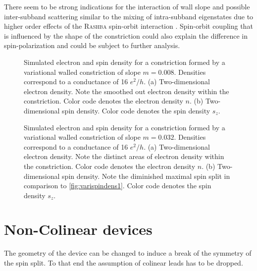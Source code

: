 There seem to be strong indications for the interaction of wall slope and possible inter-subband scattering similar to the mixing of intra-subband eigenstates due to higher order effects of the \textsc{Rashba} spin-orbit interaction \cite{Wolfgang2003PhysicaE.18.337}. Spin-orbit coupling that is influenced by the shape of the constriction could also explain the difference in spin-polarization and could be subject to further analysis.
\begin{figure}[h]
\caption{Simulated electron and spin density for a constriction formed by a variational walled constriction of slope $m=0.008$. Densities correspond to a conductance of 16 $e^2/h$. (a) Two-dimensional electron density. Note the smoothed out electron density within the constriction. Color code denotes the electron density $n$. (b) Two-dimensional spin density. Color code denotes the spin density $s_z$.}
\end{figure}
\begin{figure}[h]
\caption{Simulated electron and spin density for a constriction formed by a variational walled constriction of slope $m=0.032$. Densities correspond to a conductance of 16 $e^2/h$. (a) Two-dimensional electron density. Note the distinct areas of electron density within the constriction. Color code denotes the electron density $n$. (b) Two-dimensional spin density. Note the diminished maximal spin split in comparison to \cref{fig:varispindens1}. Color code denotes the spin density $s_z$.}
\end{figure}
\FloatBarrier
\section{Non-Colinear devices}
The geometry of the device can be changed to induce a break of the symmetry of the spin split. To that end the assumption of colinear leads has to be dropped.

